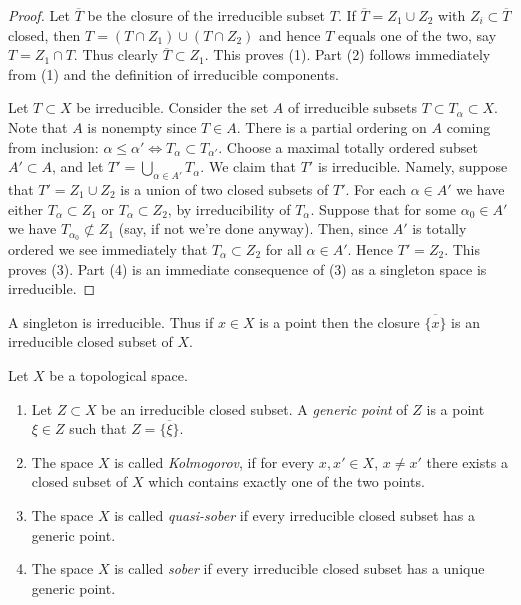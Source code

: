 \begin{proof}
Let $\overline{T}$ be the closure of the irreducible subset $T$.
If $\overline{T} = Z_1 \cup Z_2$ with $Z_i \subset \overline{T}$
closed, then $T = (T\cap Z_1) \cup (T \cap Z_2)$ and hence
$T$ equals one of the two, say $T = Z_1 \cap T$. Thus clearly
$\overline{T} \subset Z_1$. This proves (1). Part (2) follows
immediately from (1) and the definition of irreducible components.

\medskip\noindent
Let $T \subset X$ be irreducible. Consider the set $A$ of irreducible subsets
$T \subset T_\alpha \subset X$. Note that $A$ is nonempty since
$T \in A$. There is a partial ordering on $A$ coming from
inclusion: $\alpha \leq \alpha' \Leftrightarrow T_\alpha \subset T_{\alpha'}$.
Choose a maximal totally ordered subset $A' \subset A$, and let
$T' = \bigcup_{\alpha \in A'} T_\alpha$. We claim that $T'$ is
irreducible. Namely, suppose that $T' =  Z_1 \cup Z_2$ is a union
of two closed subsets of $T'$. For each $\alpha \in A'$ we have
either $T_\alpha \subset Z_1$ or $T_\alpha \subset Z_2$, by irreducibility
of $T_\alpha$. Suppose that for some $\alpha_0 \in A'$ we have
$T_{\alpha_0} \not\subset Z_1$ (say, if not we're done anyway).
Then, since $A'$ is totally ordered we see immediately that
$T_\alpha \subset Z_2$ for all $\alpha \in A'$. Hence $T' = Z_2$.
This proves (3). Part (4) is an immediate consequence of (3)
as a singleton space is irreducible.
\end{proof}

\noindent
A singleton is irreducible. Thus if $x \in X$ is a point
then the closure $\overline{\{x\}}$ is an irreducible closed
subset of $X$.

\begin{definition}
\label{definition-generic-point}
Let $X$ be a topological space.
\begin{enumerate}
\item Let $Z \subset X$ be an irreducible closed subset.
A {\it generic point} of $Z$ is a point $\xi \in Z$ such
that $Z = \overline{\{\xi\}}$.
\item The space $X$ is called {\it Kolmogorov}, if for every $x, x' \in X$,
$x \not = x'$ there exists a closed subset of $X$ which contains
exactly one of the two points.
\item The space $X$ is called {\it quasi-sober} if every
irreducible closed subset has a generic point.
\item The space $X$ is called {\it sober} if every
irreducible closed subset has a unique generic point.
\end{enumerate}
\end{definition}

